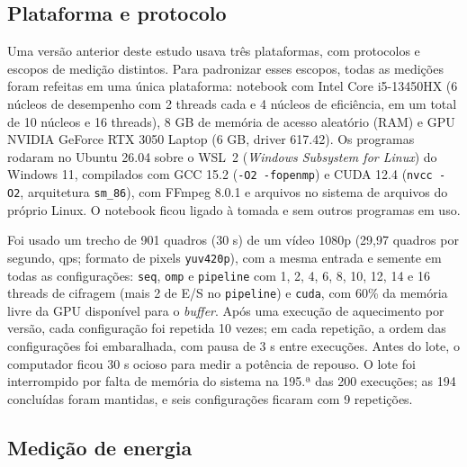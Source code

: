 \documentclass[12pt]{article}
\begin{document}
\subsection{Plataforma e protocolo}

Uma versão anterior deste estudo usava três plataformas, com protocolos e
escopos de medição distintos. Para padronizar esses escopos, todas as medições
foram refeitas em uma única plataforma: notebook com Intel Core i5-13450HX
(6 núcleos de desempenho com 2 threads cada e 4 núcleos de eficiência, em um
total de 10 núcleos e 16 threads), 8 GB de memória de acesso aleatório (RAM) e
GPU NVIDIA GeForce RTX 3050 Laptop (6 GB, driver 617.42). Os programas rodaram
no Ubuntu 26.04 sobre o WSL~2 (\textit{Windows Subsystem for Linux}) do
Windows 11, compilados com GCC 15.2 (\texttt{-O2 -fopenmp}) e CUDA 12.4
(\texttt{nvcc -O2}, arquitetura \texttt{sm\_86}), com FFmpeg 8.0.1 e arquivos no
sistema de arquivos do próprio Linux. O notebook ficou ligado à tomada e sem
outros programas em uso.

Foi usado um trecho de 901 quadros (30 s) de um vídeo 1080p (29,97 quadros por
segundo, qps; formato de pixels \texttt{yuv420p}), com a mesma entrada e
semente em todas as configurações: \texttt{seq}, \texttt{omp} e
\texttt{pipeline} com 1, 2, 4, 6, 8, 10, 12, 14 e 16 threads de cifragem (mais
2 de E/S no \texttt{pipeline}) e \texttt{cuda}, com 60\% da memória livre da GPU
disponível para o \textit{buffer}. Após uma execução de aquecimento por versão,
cada configuração foi repetida 10 vezes; em cada repetição, a ordem das
configurações foi embaralhada, com pausa de 3 s entre execuções. Antes do lote,
o computador ficou 30 s ocioso para medir a potência de repouso. O lote foi
interrompido por falta de memória do sistema na 195.ª das 200 execuções; as 194
concluídas foram mantidas, e seis configurações ficaram com 9 repetições.

\subsection{Medição de energia}
\end{document}
